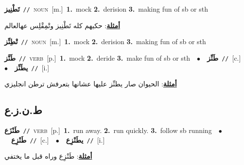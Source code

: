 \documentclass[10pt,a4paper,twoside]{article} %
\begin{document}
\begin{multicols}{2}
{\setlength\topsep{0pt}\textbf{\foreignlanguage{arabic}{تَطْنِيز}}\ {\color{gray}\texttt{//}\color{black}}\ \textsc{noun}\ [m.]\ \textbf{1.}~mock  \textbf{2.}~derision  \textbf{3.}~making fun of sb or sth\  \begin{flushright}\color{gray}\foreignlanguage{arabic}{\textbf{\underline{\foreignlanguage{arabic}{أمثلة}}}: حكيهم كله تَطْنِيز وتْمِقْلِس عهالعالم}\end{flushright}\color{black}} \vspace{2mm}

{\setlength\topsep{0pt}\textbf{\foreignlanguage{arabic}{تْطِنِّز}}\ {\color{gray}\texttt{//}\color{black}}\ \textsc{noun}\ [m.]\ \textbf{1.}~mock  \textbf{2.}~derision  \textbf{3.}~making fun of sb or sth\ } \vspace{2mm}

{\setlength\topsep{0pt}\textbf{\foreignlanguage{arabic}{طَنَّز}}\ {\color{gray}\texttt{//}\color{black}}\ \textsc{verb}\ [p.]\ \textbf{1.}~mock  \textbf{2.}~deride  \textbf{3.}~make fun of sb or sth\ \ $\bullet$\ \ \setlength\topsep{0pt}\textbf{\foreignlanguage{arabic}{طَنِّز}}\ {\color{gray}\texttt{//}\color{black}}\ [c.]\ \ $\bullet$\ \ \setlength\topsep{0pt}\textbf{\foreignlanguage{arabic}{يطَنِّز}}\ {\color{gray}\texttt{//}\color{black}}\ [i.]\  \begin{flushright}\color{gray}\foreignlanguage{arabic}{\textbf{\underline{\foreignlanguage{arabic}{أمثلة}}}: الحيوان صار يطنِّز عليها عشانها بتعرفش ترطن انجليزي}\end{flushright}\color{black}} \vspace{2mm}

\vspace{-3mm}
\subsection*{\color{blue}\foreignlanguage{arabic}{ط.ن.ز.ع}\color{blue}{}} 

{\setlength\topsep{0pt}\textbf{\foreignlanguage{arabic}{طَنْزَع}}\ {\color{gray}\texttt{//}\color{black}}\ \textsc{verb}\ [p.]\ \textbf{1.}~run away.  \textbf{2.}~run quickly.  \textbf{3.}~follow sb running\ \ $\bullet$\ \ \setlength\topsep{0pt}\textbf{\foreignlanguage{arabic}{طَنْزِع}}\ {\color{gray}\texttt{//}\color{black}}\ [c.]\ \ $\bullet$\ \ \setlength\topsep{0pt}\textbf{\foreignlanguage{arabic}{يطَنْزِع}}\ {\color{gray}\texttt{//}\color{black}}\ [i.]\  \begin{flushright}\color{gray}\foreignlanguage{arabic}{\textbf{\underline{\foreignlanguage{arabic}{أمثلة}}}: طَنْزِع وراه قبل ما يختفي}\end{flushright}\color{black}} \vspace{2mm}


\end{multicols}
\end{document}
